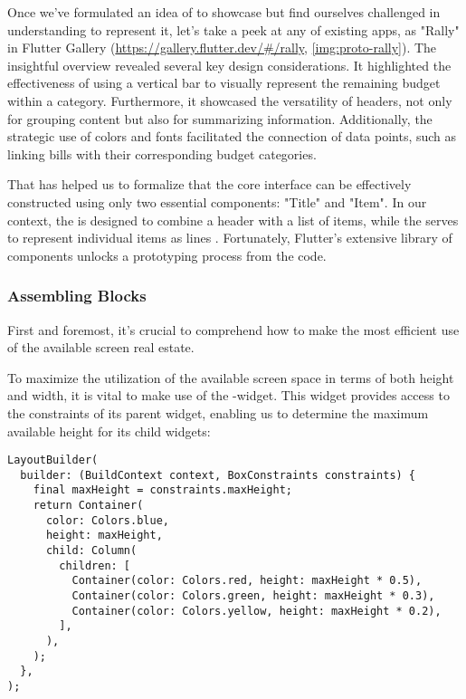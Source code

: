 Once we've formulated an idea of  to showcase but find ourselves challenged in understanding  to 
represent it, let's take a peek at any of existing apps, as "Rally" in Flutter Gallery 
(\href{https://gallery.flutter.dev/\#/rally}{https://gallery.flutter.dev/\#/rally}, \cref{img:proto-rally}).
The insightful overview revealed several key design considerations. It highlighted the effectiveness of using a 
vertical bar to visually represent the remaining budget within a category. Furthermore, it showcased the versatility of 
headers, not only for grouping content but also for summarizing information. Additionally, the strategic use of colors 
and fonts facilitated the connection of data points, such as linking bills with their corresponding budget categories. 

That has helped us to formalize that the core interface can be effectively constructed using only two essential 
components: "Title" and "Item". In our context, the  is designed to combine a header with a list of items, 
while the  serves to represent individual items as lines . Fortunately, Flutter's extensive 
library of components unlocks a prototyping process from the code.



\subsubsection{Assembling Blocks}

First and foremost, it's crucial to comprehend how to make the most efficient use of the available screen real estate.

To maximize the utilization of the available screen space in terms of both height and width, it is vital to make use of 
the -widget. This widget provides access to the constraints of its parent widget, enabling us to 
determine the maximum available height for its child widgets:

\begin{lstlisting}
LayoutBuilder(
  builder: (BuildContext context, BoxConstraints constraints) {
    final maxHeight = constraints.maxHeight;
    return Container(
      color: Colors.blue,
      height: maxHeight,
      child: Column(
        children: [
          Container(color: Colors.red, height: maxHeight * 0.5),
          Container(color: Colors.green, height: maxHeight * 0.3),
          Container(color: Colors.yellow, height: maxHeight * 0.2),
        ],
      ),
    );
  },
);
\end{lstlisting}

